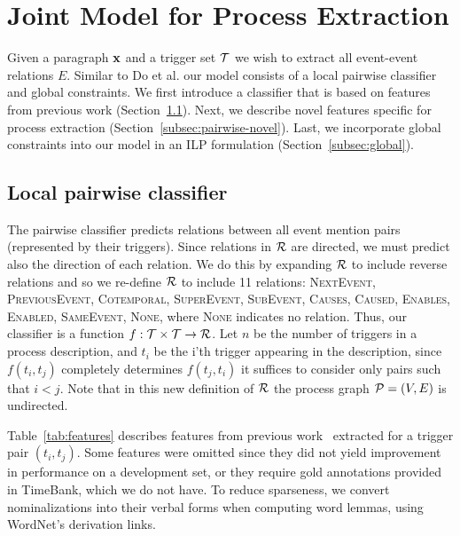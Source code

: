 \section{Joint Model for Process Extraction}

Given a paragraph $\mathbf{x}$ and a trigger set $\mathcal{T}$ we wish to extract all event-event relations $E$. Similar to Do et al.  our model consists of a local pairwise classifier and global constraints. We first introduce a classifier that is based on features from previous work (Section~\ref{subsec:pairwise}). Next, we describe novel features specific for process extraction (Section~\ref{subsec:pairwise-novel}). Last, we incorporate global constraints into our model in an ILP formulation (Section~\ref{subsec:global}).

\subsection{Local pairwise classifier} \label{subsec:pairwise}

The pairwise classifier predicts relations between all event mention pairs (represented by their triggers). Since relations in $\mathcal{R}$ are directed, we must predict also the direction of each relation. We do this by expanding $\mathcal{R}$ to include reverse relations and so we re-define $\mathcal{R}$ to include 11 relations: \textsc{NextEvent}, \textsc{PreviousEvent}, \textsc{Cotemporal}, \textsc{SuperEvent}, \textsc{SubEvent}, \textsc{Causes}, \textsc{Caused}, \textsc{Enables}, \textsc{Enabled}, \textsc{SameEvent}, \textsc{None}, where \textsc{None} indicates no relation. Thus, our classifier is a function $f:\mathcal{T} \times \mathcal{T} \rightarrow \mathcal{R}$. Let $n$ be the number of triggers in a process description, and $t_i$ be the i'th trigger appearing in the description, since $f(t_i,t_j)$ completely determines $f(t_j,t_i)$ it suffices to consider only pairs such that $i<j$. Note that in this new definition of $\mathcal{R}$ the process graph $\mathcal{P}=(V,E)$ is undirected.

Table~\ref{tab:features} describes features from previous work~\cite{Chambers08,Do12} extracted for a trigger pair $(t_i,t_j)$. Some features were omitted since they did not yield improvement in performance on a development set, or they require gold annotations provided in TimeBank, which we do not have. To reduce sparseness, we convert nominalizations into their verbal forms when computing word lemmas, using WordNet's \cite{Fellbaum1998} derivation links.

